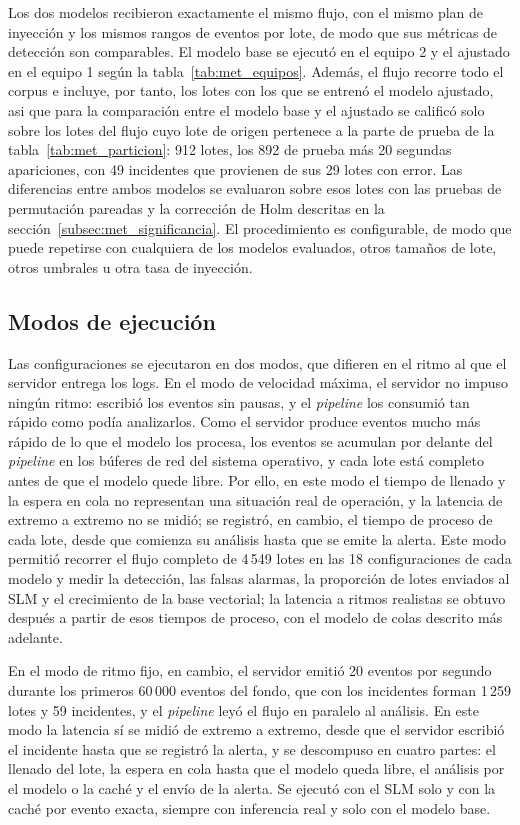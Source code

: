 Los dos modelos recibieron exactamente el mismo flujo, con el mismo plan de inyección y los mismos rangos de eventos por lote, de modo que sus métricas de detección son comparables. El modelo base se ejecutó en el equipo 2 y el ajustado en el equipo 1 según la tabla~\ref{tab:met_equipos}. Además, el flujo recorre todo el corpus e incluye, por tanto, los lotes con los que se entrenó el modelo ajustado, asi que para la comparación entre el modelo base y el ajustado se calificó solo sobre los lotes del flujo cuyo lote de origen pertenece a la parte de prueba de la tabla~\ref{tab:met_particion}: 912 lotes, los 892 de prueba más 20 segundas apariciones, con 49 incidentes que provienen de sus 29 lotes con error. Las diferencias entre ambos modelos se evaluaron sobre esos lotes con las pruebas de permutación pareadas y la corrección de Holm descritas en la sección~\ref{subsec:met_significancia}. El procedimiento es configurable, de modo que puede repetirse con cualquiera de los modelos evaluados, otros tamaños de lote, otros umbrales u otra tasa de inyección.

\subsection{Modos de ejecución}

Las configuraciones se ejecutaron en dos modos, que difieren en el ritmo al que el servidor entrega los logs. En el modo de velocidad máxima, el servidor no impuso ningún ritmo: escribió los eventos sin pausas, y el \textit{pipeline} los consumió tan rápido como podía analizarlos. Como el servidor produce eventos mucho más rápido de lo que el modelo los procesa, los eventos se acumulan por delante del \textit{pipeline} en los búferes de red del sistema operativo, y cada lote está completo antes de que el modelo quede libre. Por ello, en este modo el tiempo de llenado y la espera en cola no representan una situación real de operación, y la latencia de extremo a extremo no se midió; se registró, en cambio, el tiempo de proceso de cada lote, desde que comienza su análisis hasta que se emite la alerta. Este modo permitió recorrer el flujo completo de 4\,549 lotes en las 18 configuraciones de cada modelo y medir la detección, las falsas alarmas, la proporción de lotes enviados al SLM y el crecimiento de la base vectorial; la latencia a ritmos realistas se obtuvo después a partir de esos tiempos de proceso, con el modelo de colas descrito más adelante.

En el modo de ritmo fijo, en cambio, el servidor emitió 20 eventos por segundo durante los primeros 60\,000 eventos del fondo, que con los incidentes forman 1\,259 lotes y 59 incidentes, y el \textit{pipeline} leyó el flujo en paralelo al análisis. En este modo la latencia sí se midió de extremo a extremo, desde que el servidor escribió el incidente hasta que se registró la alerta, y se descompuso en cuatro partes: el llenado del lote, la espera en cola hasta que el modelo queda libre, el análisis por el modelo o la caché y el envío de la alerta. Se ejecutó con el SLM solo y con la caché por evento exacta, siempre con inferencia real y solo con el modelo base.

